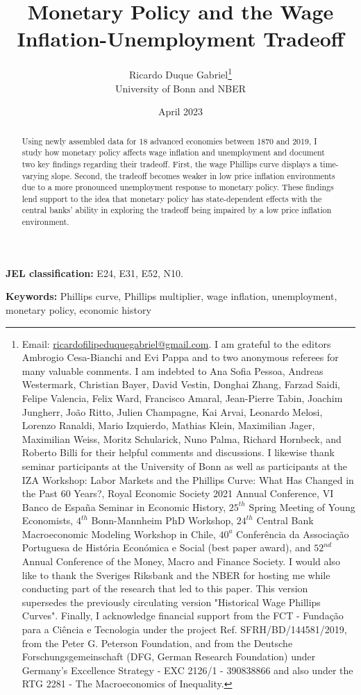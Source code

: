 \documentclass[12pt]{article}
\title{\textbf{Monetary Policy and the Wage Inflation-Unemployment Tradeoff}}
\author{Ricardo Duque Gabriel\footnote{\scriptsize Email: \href{mailto:ricardofilipeduquegabriel@gmail.com}{ricardofilipeduquegabriel@gmail.com}. I am grateful to the editors Ambrogio Cesa-Bianchi and Evi Pappa and to two anonymous referees for many valuable comments. I am indebted to Ana Sofia Pessoa, Andreas Westermark, Christian Bayer, David Vestin, Donghai Zhang, Farzad Saidi, Felipe Valencia, Felix Ward, Francisco Amaral, Jean-Pierre Tabin, Joachim Jungherr, João Ritto, Julien Champagne, Kai Arvai, Leonardo Melosi, Lorenzo Ranaldi, Mario Izquierdo, Mathias Klein, Maximilian Jager, Maximilian Weiss, Moritz Schularick, Nuno Palma, Richard Hornbeck, and Roberto Billi for their helpful comments and discussions. I likewise thank seminar participants at the University of Bonn as well as participants at the IZA Workshop: Labor Markets and the Phillips Curve: What Has Changed in the Past 60 Years?, Royal Economic Society 2021 Annual Conference, VI Banco de España Seminar in Economic History, $25^{th}$ Spring Meeting of Young Economists, $4^{th}$ Bonn-Mannheim PhD Workshop, $24^{th}$ Central Bank Macroeconomic Modeling Workshop in Chile, $40^a$ Conferência da Associação Portuguesa de História Económica e Social (best paper award), and $52^{nd}$ Annual Conference of the Money, Macro and Finance Society. I would also like to thank the Sveriges Riksbank and the NBER for hosting me while conducting part of the research that led to this paper. This version supersedes the previously circulating version "Historical Wage Phillips Curves". Finally, I acknowledge financial support from the FCT - Fundação para a Ciência e Tecnologia under the project Ref. SFRH/BD/144581/2019, from the Peter G. Peterson Foundation, and from the Deutsche Forschungsgemeinschaft (DFG, German Research Foundation) under Germany's Excellence Strategy - EXC 2126/1 - 390838866 and also under the RTG 2281 - The Macroeconomics of Inequality.}\\ University of Bonn and NBER}
\date{April 2023}
\begin{document}
\begin{titlepage}

\thispagestyle{empty}
\maketitle

\begin{abstract}
\normalsize Using newly assembled data for 18 advanced economies between 1870 and 2019, I study how monetary policy affects wage inflation and unemployment and document two key findings regarding their tradeoff. First, the wage Phillips curve displays a time-varying slope. Second, the tradeoff becomes weaker in low price inflation environments due to a more pronounced unemployment response to monetary policy. These findings lend support to the idea that monetary policy has state-dependent effects with the central banks' ability in exploring the tradeoff being impaired by a low price inflation environment.


\end{abstract}

\vspace{1em}

\textbf{JEL classification:} E24, E31, E52, N10. 

\vspace{1em}

\textbf{Keywords:} Phillips curve, Phillips multiplier, wage inflation, unemployment, monetary policy, economic history 

\end{titlepage}
\end{document}
